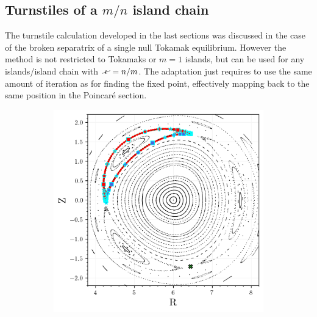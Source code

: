 \subsection{Turnstiles of a $m/n$ island chain}

The turnstile calculation developed in the last sections was discussed in the case of the broken separatrix of a single null Tokamak equilibrium. However the method is not restricted to Tokamaks or $m=1$ islands, but can be used for any islands/island chain with $\iotaslash = n/m$. The adaptation just requires to use the same amount of iteration as for finding the fixed point, effectively mapping back to the same position in the Poincaré section.

\begin{figure}[h!]
    \centering
    \begin{subfigure}[c]{0.49\textwidth}
        \centering
        \includegraphics[width=\textwidth]{images/high-aspect-ratio/heteroclinics_outer_3.png}
        \caption{}
    \end{subfigure}
    \hfill
    \begin{subfigure}[c]{0.49\textwidth}
        \centering

\end{subfigure}
\end{figure}
